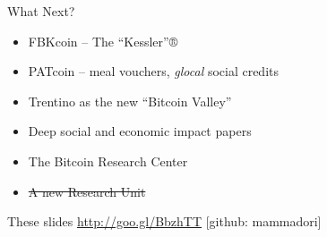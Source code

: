 \documentclass[english,compress]{beamer}
\begin{document}
\begin{frame}{What Next?}
 \begin{itemize}
  \item FBKcoin -- The ``Kessler''®
  \item PATcoin -- meal vouchers, \emph{glocal} social credits
  \item Trentino as the new ``Bitcoin Valley''
  \item Deep social and economic impact papers
  \item The Bitcoin Research Center
  \item \st{A new Research Unit}
 \end{itemize}
 
  \begin{block}{These slides}
  \url{http://goo.gl/BbzhTT} [github: mammadori]
  \end{block}

\end{frame}
\end{document}
